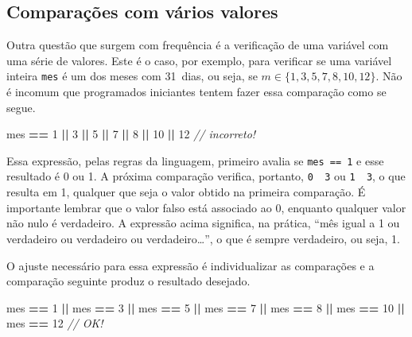 \documentclass[
  11pt,
  a4paper,
]{scrbook}
\newenvironment{Shaded}{\begin{snugshade}}{\end{snugshade}}
\newcommand{\CommentTok}[1]{\textcolor[rgb]{0.56,0.35,0.01}{\textit{#1}}}
\newcommand{\DecValTok}[1]{\textcolor[rgb]{0.00,0.00,0.81}{#1}}
\newcommand{\NormalTok}[1]{#1}
\newcommand{\OperatorTok}[1]{\textcolor[rgb]{0.81,0.36,0.00}{\textbf{#1}}}
\begin{document}
\subsection{Comparações com vários
valores}\label{comparauxe7uxf5es-com-vuxe1rios-valores}

Outra questão que surgem com frequência é a verificação de uma variável
com uma série de valores. Este é o caso, por exemplo, para verificar se
uma variável inteira \texttt{mes} é um dos meses com 31~dias, ou seja,
se \({m \in \{ 1, 3, 5, 7, 8, 10, 12 \}}\). Não é incomum que
programados iniciantes tentem fazer essa comparação como se segue.

\begin{Shaded}
\begin{Highlighting}[]
\NormalTok{mes }\OperatorTok{==} \DecValTok{1} \OperatorTok{||} \DecValTok{3} \OperatorTok{||} \DecValTok{5} \OperatorTok{||} \DecValTok{7} \OperatorTok{||} \DecValTok{8} \OperatorTok{||} \DecValTok{10} \OperatorTok{||} \DecValTok{12}  \CommentTok{// incorreto!}
\end{Highlighting}
\end{Shaded}

Essa expressão, pelas regras da linguagem, primeiro avalia se
\texttt{mes\ ==\ 1} e esse resultado é 0 ou 1. A próxima comparação
verifica, portanto, \texttt{0\ \textbar{}\textbar{}\ 3} ou
\texttt{1\ \textbar{}\textbar{}\ 3}, o que resulta em 1, qualquer que
seja o valor obtido na primeira comparação. É importante lembrar que o
valor falso está associado ao 0, enquanto qualquer valor não nulo é
verdadeiro. A expressão acima significa, na prática, ``mês igual a 1 ou
verdadeiro ou verdadeiro ou verdadeiro\ldots{}'', o que é sempre
verdadeiro, ou seja, 1.

O ajuste necessário para essa expressão é individualizar as comparações
e a comparação seguinte produz o resultado desejado.

\begin{Shaded}
\begin{Highlighting}[]
\NormalTok{mes }\OperatorTok{==} \DecValTok{1} \OperatorTok{||}\NormalTok{ mes }\OperatorTok{==} \DecValTok{3} \OperatorTok{||}\NormalTok{ mes }\OperatorTok{==} \DecValTok{5} \OperatorTok{||}\NormalTok{ mes }\OperatorTok{==} \DecValTok{7} \OperatorTok{||}\NormalTok{  mes }\OperatorTok{==} \DecValTok{8} \OperatorTok{||}
\NormalTok{    mes }\OperatorTok{==} \DecValTok{10} \OperatorTok{||}\NormalTok{ mes }\OperatorTok{==} \DecValTok{12}  \CommentTok{// OK!}
\end{Highlighting}
\end{Shaded}
\end{document}
